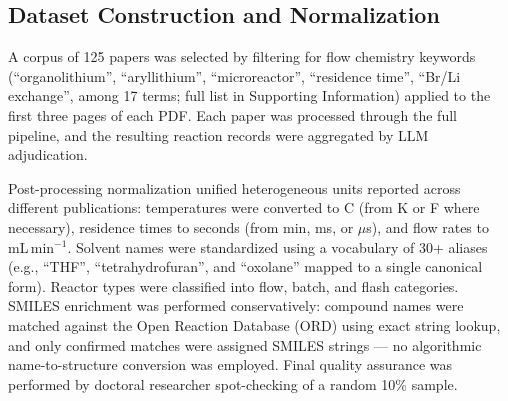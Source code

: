 \documentclass[journal=jcisd8,manuscript=article]{achemso}
\begin{document}
\subsection{Dataset Construction and Normalization}
A corpus of 125 papers was selected by filtering for flow chemistry keywords (``organolithium'', ``aryllithium'', ``microreactor'', ``residence time'', ``Br/Li exchange'', among 17 terms; full list in Supporting Information) applied to the first three pages of each PDF.
Each paper was processed through the full pipeline, and the resulting reaction records were aggregated by LLM adjudication.

Post-processing normalization unified heterogeneous units reported across different publications: temperatures were converted to \textdegree{}C (from K or \textdegree{}F where necessary), residence times to seconds (from min, ms, or $\mu$s), and flow rates to mL\,min$^{-1}$.
Solvent names were standardized using a vocabulary of 30+ aliases (e.g., ``THF'', ``tetrahydrofuran'', and ``oxolane'' mapped to a single canonical form).
Reactor types were classified into flow, batch, and flash categories.
SMILES enrichment was performed conservatively: compound names were matched against the Open Reaction Database (ORD) using exact string lookup, and only confirmed matches were assigned SMILES strings --- no algorithmic name-to-structure conversion was employed.
Final quality assurance was performed by doctoral researcher spot-checking of a random 10\% sample.
\end{document}
